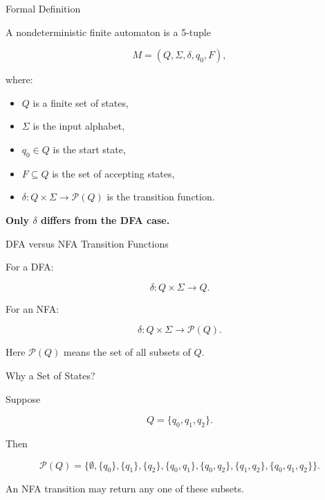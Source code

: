 \documentclass[10pt,aspectratio=169]{beamer}
\newcommand{\powset}[1]{\mathcal P({#1})}
\begin{document}
\begin{frame}{Formal Definition}

A nondeterministic finite automaton is a 5-tuple

\[
M=(Q,\Sigma,\delta,q_0,F),
\]

where:

\begin{itemize}
\item \(Q\) is a finite set of states,
\item \(\Sigma\) is the input alphabet,
\item \(q_0\in Q\) is the start state,
\item \(F\subseteq Q\) is the set of accepting states,
\item $\delta:Q\times\Sigma\rightarrow \powset{Q}$ is the transition function.
\end{itemize}

\vspace{0.5em}

\textbf{Only \(\delta\) differs from the DFA case.}

\end{frame}

\begin{frame}{DFA versus NFA Transition Functions}

For a DFA:

\[
\delta:Q\times\Sigma\rightarrow Q.
\]

For an NFA:

\[
\delta:Q\times\Sigma\rightarrow \powset{Q}.
\]

\vspace{1em}

Here \(\powset{Q}\) means the set of all subsets of \(Q\).

\end{frame}

\begin{frame}{Why a Set of States?}

Suppose

\[
Q=\{q_0,q_1,q_2\}.
\]

Then

\[
\powset{Q}
=
\{
\emptyset,
\{q_0\},
\{q_1\},
\{q_2\},
\{q_0,q_1\},
\{q_0,q_2\},
\{q_1,q_2\},
\{q_0,q_1,q_2\}
\}.
\]

\vspace{0.5em}

An NFA transition may return any one of these subsets.

\end{frame}
\end{document}
